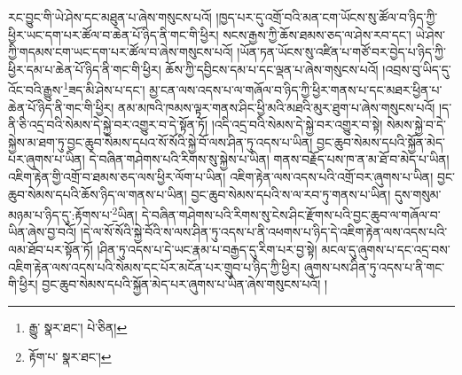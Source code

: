 རང་བྱུང་གི་ཡེ་ཤེས་དང་མཐུན་པ་ཞེས་གསུངས་པའོ། །ཁྱད་པར་དུ་འགྲོ་བའི་མན་ངག་ཡོངས་སུ་ཚོལ་བ་ཉིད་ཀྱི་ཕྱིར་ཡང་དག་པར་ཚོལ་བ་ཆེན་པོ་ཉིད་ནི་གང་གི་ཕྱིར། སངས་རྒྱས་ཀྱི་ཆོས་ཐམས་ཅད་ལ་ཤེས་རབ་དང་། ཡེ་ཤེས་ཀྱི་གདམས་ངག་ཡང་དག་པར་ཚོལ་བ་ཞེས་གསུངས་པའོ། །ཡོན་ཏན་ཡོངས་སུ་འཛིན་པ་གཙོ་བར་བྱེད་པ་ཉིད་ཀྱི་ཕྱིར་དམ་པ་ཆེན་པོ་ཉིད་ནི་གང་གི་ཕྱིར། ཆོས་ཀྱི་དབྱིངས་དམ་པ་དང་ལྡན་པ་ཞེས་གསུངས་པའོ། །འབྲས་བུ་ཡིད་དུ་འོང་བའི་རྒྱུས་\footnote{རྒྱུ་  སྣར་ཐང་།  པེ་ཅིན། }ཟད་མི་ཤེས་པ་དང་། མྱ་ངན་ལས་འདས་པ་ལ་གཞོལ་བ་ཉིད་ཀྱི་ཕྱིར་གནས་པ་དང་མཐར་ཕྱིན་པ་ཆེན་པོ་ཉིད་ནི་གང་གི་ཕྱིར། ནམ་མཁའི་ཁམས་ལྟར་གནས་ཤིང་ཕྱི་མའི་མཐའི་མུར་ཐུག་པ་ཞེས་གསུངས་པའོ། །ད་ནི་ཅི་འདྲ་བའི་སེམས་དེ་སྐྱེ་བར་འགྱུར་བ་དེ་སྟོན་ཏོ། །འདི་འདྲ་བའི་སེམས་དེ་སྐྱེ་བར་འགྱུར་བ་སྟེ། སེམས་སྐྱེ་བ་དེ་སྐྱེས་མ་ཐག་ཏུ་བྱང་ཆུབ་སེམས་དཔའ་སོ་སོའི་སྐྱེ་བོ་ལས་ཤིན་ཏུ་འདས་པ་ཡིན། བྱང་ཆུབ་སེམས་དཔའི་སྐྱོན་མེད་པར་ཞུགས་པ་ཡིན། དེ་བཞིན་གཤེགས་པའི་རིགས་སུ་སྐྱེས་པ་ཡིན། གནས་བརྗོད་པས་ཁ་ན་མ་ཐོ་བ་མེད་པ་ཡིན། འཇིག་རྟེན་གྱི་འགྲོ་བ་ཐམས་ཅད་ལས་ཕྱིར་ལོག་པ་ཡིན། འཇིག་རྟེན་ལས་འདས་པའི་འགྲོ་བར་ཞུགས་པ་ཡིན། བྱང་ཆུབ་སེམས་དཔའི་ཆོས་ཉིད་ལ་གནས་པ་ཡིན། བྱང་ཆུབ་སེམས་དཔའི་ས་ལ་རབ་ཏུ་གནས་པ་ཡིན། དུས་གསུམ་མཉམ་པ་ཉིད་དུ་:རྟོགས་པ་\footnote{རྟོག་པ་  སྣར་ཐང་། }ཡིན། དེ་བཞིན་གཤེགས་པའི་རིགས་སུ་ངེས་ཤིང་རྫོགས་པའི་བྱང་ཆུབ་ལ་གཞོལ་བ་ཡིན་ཞེས་བྱ་བའོ། །དེ་ལ་སོ་སོའི་སྐྱེ་བོའི་ས་ལས་ཤིན་ཏུ་འདས་པ་ནི་འཕགས་པ་ཉིད་དེ་འཇིག་རྟེན་ལས་འདས་པའི་ལམ་ཐོབ་པར་སྟོན་ཏོ། །ཤིན་ཏུ་འདས་པ་དེ་ཡང་རྣམ་པ་བརྒྱད་དུ་རིག་པར་བྱ་སྟེ། མངལ་དུ་ཞུགས་པ་དང་འདྲ་བས་འཇིག་རྟེན་ལས་འདས་པའི་སེམས་དང་པོར་མངོན་པར་གྲུབ་པ་ཉིད་ཀྱི་ཕྱིར། ཞུགས་པས་ཤིན་ཏུ་འདས་པ་ནི་གང་གི་ཕྱིར། བྱང་ཆུབ་སེམས་དཔའི་སྐྱོན་མེད་པར་ཞུགས་པ་ཡིན་ཞེས་གསུངས་པའོ། །
